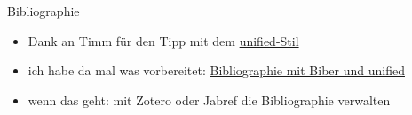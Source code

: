 \begin{frame}[fragile]{Bibliographie}
    
    \begin{itemize}[<+->]
        \item Dank an Timm für den Tipp mit dem \href{http://celxj.org/downloads/USS-NoComments.pdf}{unified-Stil}
        \item ich habe da mal was vorbereitet: \href{}{Bibliographie mit Biber und unified}
        \item wenn das geht: mit Zotero oder Jabref die Bibliographie verwalten
    \end{itemize}
\end{frame}